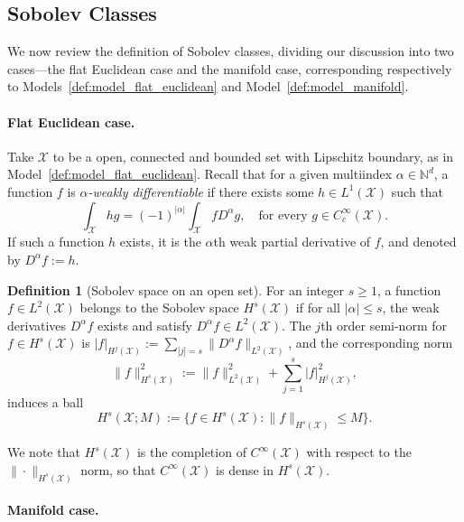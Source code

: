 \documentclass{article}
\newcommand{\1}{\mathbf{1}}
\newcommand{\Leb}{L}
\newcommand{\mc}[1]{\mathcal{#1}}
\theoremstyle{alden}
\theoremstyle{aldenthm}
\theoremstyle{definition}
\newtheorem{definition}{Definition}[section]
\theoremstyle{remark}
\begin{document}
\subsection{Sobolev Classes}
\label{sec:sobolev}
We now review the definition of Sobolev classes, dividing our discussion into two cases---the flat Euclidean case and the manifold case, corresponding respectively to Models~\ref{def:model_flat_euclidean} and Model~\ref{def:model_manifold}.

\paragraph{Flat Euclidean case.}
Take $\mc{X}$ to be a open, connected and bounded set with Lipschitz boundary, as in Model~\ref{def:model_flat_euclidean}. Recall that for a given multiindex $\alpha \in \mathbb{N}^d$, a function $f$ is \emph{$\alpha$-weakly differentiable} if there exists some $h \in L^1(\mc{X})$ such that
\begin{equation*}
\int_{\mc{X}} h g = (-1)^{|\alpha|} \int_{\mc{X}} f D^{\alpha}g, \quad \textrm{for every $g \in C_c^{\infty}(\mc{X})$.}
\end{equation*}
If such a function $h$ exists, it is the $\alpha$th weak partial derivative of $f$, and denoted by $D^{\alpha}f := h$. 

\begin{definition}[Sobolev space on an open set]
	\label{def:sobolev_space}
	For an integer $s \geq 1$, a function $f \in L^2(\mc{X})$ belongs to the Sobolev space $H^s(\mc{X})$ if for all $|\alpha| \leq s$, the weak derivatives $D^{\alpha}f$ exists and satisfy $D^{\alpha}f \in L^2(\mc{X})$. The $j$th order semi-norm for $f \in H^s(\mc{X})$ is $|f|_{H^j(\mc{X})} := \sum_{|j| = s}\|D^{\alpha}f\|_{\Leb^2(\mc{X})}$, and the corresponding norm
	\begin{equation*}
	\|f\|_{H^s(\mc{X})}^2 := \|f\|_{\Leb^2(\mc{X})}^2 + \sum_{j = 1}^{s} |f|_{H^j(\mc{X})}^2,
	\end{equation*}
	induces a ball
	\begin{equation*}
	H^s(\mc{X};M) := \bigl\{f \in H^s(\mc{X}): \|f\|_{H^s(\mc{X})} \leq M\bigr\}.
	\end{equation*} 
\end{definition}
We note that $H^s(\mc{X})$ is the completion of $C^{\infty}(\mc{X})$ with respect to the $\|\cdot\|_{H^s(\mc{X})}$ norm, so that $C^{\infty}(\mc{X})$ is dense in $H^s(\mc{X})$. 

\paragraph{Manifold case.}
\end{document}
